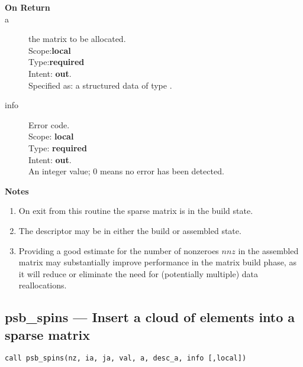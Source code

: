 \begin{description}
\item[\bf On Return]
\item[a] the matrix to be allocated.\\
Scope:{\bf local}\\
Type:{\bf required}\\
Intent: {\bf out}.\\
Specified as: a structured data of type \spdata.
\item[info] Error code.\\
Scope: {\bf local} \\
Type: {\bf required} \\
Intent: {\bf out}.\\
An integer value; 0 means no error has been detected. 
\end{description}
{\par\noindent\large\bfseries Notes}
\begin{enumerate}
\item On exit from this routine the sparse matrix  is in the build
  state.
\item The descriptor may be in either the build or assembled state.
\item Providing a good estimate for the number of nonzeroes $nnz$ in
  the assembled matrix may substantially improve performance in the
  matrix build phase, as it will reduce or eliminate the need for
  (potentially multiple) data reallocations. 
\end{enumerate}



%
%
\clearpage\subsection*{psb\_spins --- Insert a cloud of elements into a sparse
  matrix}

\begin{verbatim}
call psb_spins(nz, ia, ja, val, a, desc_a, info [,local])
\end{verbatim}

